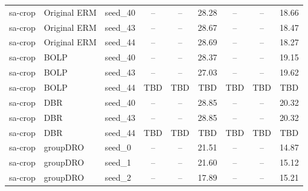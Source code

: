 \documentclass[11pt]{article}
\begin{document}
\begin{table}[h!]
{\begin{tabular}{lllcccccc}
\midrule

sa-crop & Original ERM & seed\_40 & -- & -- & 28.28 & -- & -- & 18.66 \\
sa-crop & Original ERM & seed\_43 & -- & -- & 28.67 & -- & -- & 18.47 \\
sa-crop & Original ERM & seed\_44 & -- & -- & 28.69 & -- & -- & 18.27 \\

sa-crop & BOLP & seed\_40 & -- & -- & 28.37 & -- & -- & 19.15 \\
sa-crop & BOLP & seed\_43 & -- & -- & 27.03 & -- & -- & 19.62 \\
sa-crop & BOLP & seed\_44 & TBD & TBD & TBD & TBD & TBD & TBD \\

sa-crop & DBR & seed\_40 & -- & -- & 28.85 & -- & -- & 20.32 \\
sa-crop & DBR & seed\_43 & -- & -- & 28.85 & -- & -- & 20.32 \\
sa-crop & DBR & seed\_44 & TBD & TBD & TBD & TBD & TBD & TBD \\

sa-crop & groupDRO & seed\_0 & -- & -- & 21.51 & -- & -- & 14.87 \\
sa-crop & groupDRO & seed\_1 & -- & -- & 21.60 & -- & -- & 15.12 \\
sa-crop & groupDRO & seed\_2 & -- & -- & 17.89 & -- & -- & 15.21 \\

\bottomrule
\end{tabular}%
}
\end{table}



\end{document}
